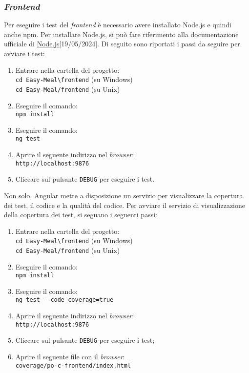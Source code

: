 \subsubsection{\textit{Frontend}} 
Per eseguire i test del \textit{frontend} è necessario avere installato Node.js 
e quindi anche npm. Per installare Node.js, si può fare riferimento alla
documentazione ufficiale di \href{https://nodejs.org/en/download/package-manager}{Node.js}[19/05/2024]. 
Di seguito sono riportati i passi da seguire per avviare i test:
\begin{enumerate}
	\item Entrare nella cartella del progetto: \\
		\texttt{cd Easy-Meal\textbackslash frontend} (su Windows) \\
		\texttt{cd Easy-Meal/frontend} (su Unix)
	\item Eseguire il comando: \\
		\texttt{npm install}
	\item Eseguire il comando: \\
		\texttt{ng test}
	\item Aprire il seguente indirizzo nel \textit{browser}: \\
		\texttt{http://localhost:9876}
	\item Cliccare sul pulsante \texttt{DEBUG} per eseguire i test.
\end{enumerate}

Non solo, Angular mette a disposizione un servizio per visualizzare la copertura
dei test, il codice e la qualità del codice. Per avviare il servizio di
visualizzazione della copertura dei test, si seguano i seguenti passi:
\begin{enumerate}
	\item Entrare nella cartella del progetto: \\
		\texttt{cd Easy-Meal\textbackslash frontend} (su Windows) \\
		\texttt{cd Easy-Meal/frontend} (su Unix)
	\item Eseguire il comando: \\
		\texttt{npm install}
	\item Eseguire il comando: \\
		\texttt{ng test ----code-coverage=true}
	\item Aprire il seguente indirizzo nel \textit{browser}: \\
		\texttt{http://localhost:9876}
	\item Cliccare sul pulsante \texttt{DEBUG} per eseguire i test;
	\item Aprire il seguente file con il \textit{browser}: \\
		\texttt{coverage/po-c-frontend/index.html}
\end{enumerate}


